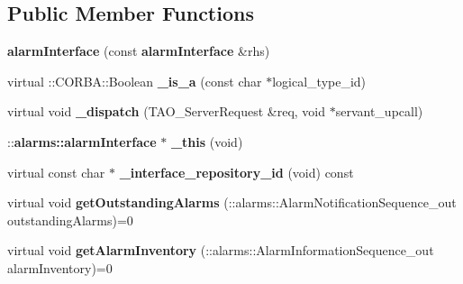 \subsection*{Public Member Functions}
\begin{DoxyCompactItemize}
\item 
{\bfseries alarm\+Interface} (const {\bf alarm\+Interface} \&rhs)\label{classPOA__alarms_1_1alarmInterface_a2b8cc8b8f609d8ffb8d8ed52265928e7}

\item 
virtual \+::C\+O\+R\+B\+A\+::\+Boolean {\bfseries \+\_\+is\+\_\+a} (const char $\ast$logical\+\_\+type\+\_\+id)\label{classPOA__alarms_1_1alarmInterface_a254f5738de29b3c689e541a65c8ee4c4}

\item 
virtual void {\bfseries \+\_\+dispatch} (T\+A\+O\+\_\+\+Server\+Request \&req, void $\ast$servant\+\_\+upcall)\label{classPOA__alarms_1_1alarmInterface_a312627f52989ddc02dd467eb553002e4}

\item 
\+::{\bf alarms\+::alarm\+Interface} $\ast$ {\bfseries \+\_\+this} (void)\label{classPOA__alarms_1_1alarmInterface_a5e8db78a4bc35212c8e8b5e3744a681b}

\item 
virtual const char $\ast$ {\bfseries \+\_\+interface\+\_\+repository\+\_\+id} (void) const \label{classPOA__alarms_1_1alarmInterface_a4412493f1fa7f47dadfa2c113664500b}

\item 
virtual void {\bfseries get\+Outstanding\+Alarms} (\+::alarms\+::\+Alarm\+Notification\+Sequence\+\_\+out outstanding\+Alarms)=0\label{classPOA__alarms_1_1alarmInterface_a53634e90027ff593b08e2e988c145e85}

\item 
virtual void {\bfseries get\+Alarm\+Inventory} (\+::alarms\+::\+Alarm\+Information\+Sequence\+\_\+out alarm\+Inventory)=0\label{classPOA__alarms_1_1alarmInterface_aae27d7d589b1d16be339c97cf086d02c}

\end{DoxyCompactItemize}
